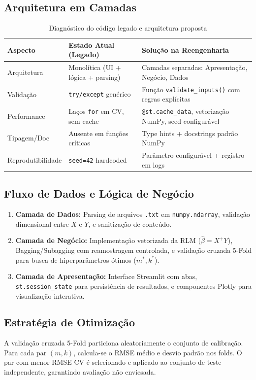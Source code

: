 \documentclass[12pt,a4paper]{article}
\begin{document}
\subsection{Arquitetura em Camadas}
\begin{table}[H]
\centering
\caption{Diagnóstico do código legado e arquitetura proposta}
\begin{tabularx}{\textwidth}{l X X}
\toprule
\textbf{Aspecto} & \textbf{Estado Atual (Legado)} & \textbf{Solução na Reengenharia} \\
\midrule
Arquitetura & Monolítica (UI + lógica + parsing) & Camadas separadas: Apresentação, Negócio, Dados \\
Validação & \texttt{try/except} genérico & Função \texttt{validate\_inputs()} com regras explícitas \\
Performance & Laços \texttt{for} em CV, sem cache & \texttt{@st.cache\_data}, vetorização NumPy, seed configurável \\
Tipagem/Doc & Ausente em funções críticas & Type hints + docstrings padrão NumPy \\
Reprodutibilidade & \texttt{seed=42} hardcoded & Parâmetro configurável + registro em logs \\
\bottomrule
\end{tabularx}
\end{table}

\subsection{Fluxo de Dados e Lógica de Negócio}
\begin{enumerate}[leftmargin=1.5cm]
    \item \textbf{Camada de Dados:} Parsing de arquivos \texttt{.txt} em \texttt{numpy.ndarray}, validação dimensional entre $X$ e $Y$, e sanitização de conteúdo.
    \item \textbf{Camada de Negócio:} Implementação vetorizada da RLM ($\hat{\beta} = X^+ Y$), Bagging/Subagging com reamostragem controlada, e validação cruzada 5-Fold para busca de hiperparâmetros ótimos ($m^*, k^*$).
    \item \textbf{Camada de Apresentação:} Interface Streamlit com abas, \texttt{st.session\_state} para persistência de resultados, e componentes Plotly para visualização interativa.
\end{enumerate}

\subsection{Estratégia de Otimização}
A validação cruzada 5-Fold particiona aleatoriamente o conjunto de calibração. Para cada par $(m, k)$, calcula-se o RMSE médio e desvio padrão nos folds. O par com menor RMSE-CV é selecionado e aplicado ao conjunto de teste independente, garantindo avaliação não enviesada.
\end{document}
